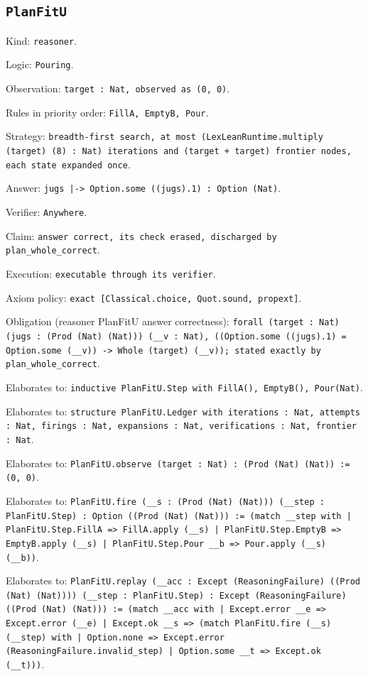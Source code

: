\documentclass[11pt]{article}
\begin{document}
\subsection*{\texttt{PlanFitU}}
\noindent Kind: \texttt{reasoner}.\par
\noindent Logic: \texttt{Pouring}.\par
\noindent Observation: \texttt{target : Nat, observed as (0, 0)}.\par
\noindent Rules in priority order: \texttt{FillA, EmptyB, Pour}.\par
\noindent Strategy: \texttt{breadth-first search, at most (LexLeanRuntime.multiply (target) (8) : Nat) iterations and (target + target) frontier nodes, each state expanded once}.\par
\noindent Answer: \texttt{jugs |-> Option.some ((jugs).1) : Option (Nat)}.\par
\noindent Verifier: \texttt{Anywhere}.\par
\noindent Claim: \texttt{answer correct, its check erased, discharged by plan\_whole\_correct}.\par
\noindent Execution: \texttt{executable through its verifier}.\par
\noindent Axiom policy: \texttt{exact [Classical.choice, Quot.sound, propext]}.\par
\noindent Obligation (reasoner PlanFitU answer correctness): \texttt{forall (target : Nat) (jugs : (Prod (Nat) (Nat))) (\_\_v : Nat), ((Option.some ((jugs).1) = Option.some (\_\_v)) -> Whole (target) (\_\_v)); stated exactly by plan\_whole\_correct}.\par
\noindent Elaborates to: \texttt{inductive PlanFitU.Step with FillA(), EmptyB(), Pour(Nat)}.\par
\noindent Elaborates to: \texttt{structure PlanFitU.Ledger with iterations : Nat, attempts : Nat, firings : Nat, expansions : Nat, verifications : Nat, frontier : Nat}.\par
\noindent Elaborates to: \texttt{PlanFitU.observe (target : Nat) : (Prod (Nat) (Nat)) := (0, 0)}.\par
\noindent Elaborates to: \texttt{PlanFitU.fire (\_\_s : (Prod (Nat) (Nat))) (\_\_step : PlanFitU.Step) : Option ((Prod (Nat) (Nat))) := (match \_\_step with | PlanFitU.Step.FillA => FillA.apply (\_\_s) | PlanFitU.Step.EmptyB => EmptyB.apply (\_\_s) | PlanFitU.Step.Pour \_\_b => Pour.apply (\_\_s) (\_\_b))}.\par
\noindent Elaborates to: \texttt{PlanFitU.replay (\_\_acc : Except (ReasoningFailure) ((Prod (Nat) (Nat)))) (\_\_step : PlanFitU.Step) : Except (ReasoningFailure) ((Prod (Nat) (Nat))) := (match \_\_acc with | Except.error \_\_e => Except.error (\_\_e) | Except.ok \_\_s => (match PlanFitU.fire (\_\_s) (\_\_step) with | Option.none => Except.error (ReasoningFailure.invalid\_step) | Option.some \_\_t => Except.ok (\_\_t)))}.\par
\end{document}
